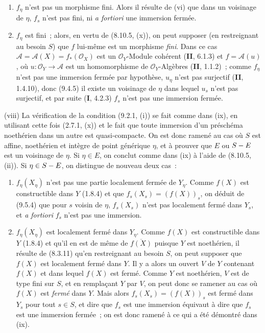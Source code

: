 \begin{enumerate}[label=\upshape{$\arabic{enumi}^\circ$}]
  \item $f_\eta$ n'est pas un morphisme fini. Alors il résulte de (vi) que dans
  un voisinage de $\eta$, $f_s$ n'est pas fini, ni \emph{a fortiori} une
  immersion fermée.

  \item $f_\eta$ est fini~; alors, en vertu de (8.10.5, (x)), on peut supposer
  (en restreignant au besoin $S$) que $f$ lui-même est un morphisme \emph{fini}.
  Dans ce cas $\mathcal A=\mathcal A(X)=f_*(\mathcal O_X)$ est un
  $\mathcal O_Y$-Module cohérent (\textbf{II}, 6.1.3) et
  $f=\mathcal A(u)$, où $u:\mathcal O_Y\to\mathcal A$ est un homomorphisme de
  $\mathcal O_Y$-Algèbres (\textbf{II}, 1.1.2)~; comme $f_\eta$ n'est pas une
  immersion fermée par hypothèse, $u_\eta$ n'est pas surjectif (\textbf{II},
  1.4.10), donc (9.4.5) il existe un voisinage de $\eta$ dans lequel $u_s$
  n'est pas surjectif, et par suite (\textbf{I}, 4.2.3) $f_s$ n'est pas une
  immersion fermée.
\end{enumerate}

(viii) La vérification de la condition (9.2.1, (i)) se fait comme dans (ix), en
utilisant cette fois (2.7.1, (x)) et le fait que toute immersion d'un préschéma
noethérien dans un autre est quasi-compacte. On est donc ramené au cas où $S$
est affine, noethérien et intègre de point générique $\eta$, et à prouver que
$E$ ou $S- E$ est un voisinage de $\eta$. Si $\eta\in E$, on conclut comme dans
(ix) à l'aide de (8.10.5, (ii)). Si $\eta\in S- E$, on distingue de nouveau
deux cas~:

\begin{enumerate}[label=\upshape{$\arabic{enumi}^\circ$}]
  \item{} $f_\eta(X_\eta)$ n'est pas une partie localement fermée de $Y_\eta$.
  Comme $f(X)$ est constructible dans $Y$ (1.8.4) et que
  $f_s(X_s)=(f(X))_s$, on déduit de (9.5.4) que pour $s$ voisin de $\eta$,
  $f_s(X_s)$ n'est pas localement fermé dans $Y_s$, et \emph{a fortiori}
  $f_s$ n'est pas une immersion.

  \item $f_\eta(X_\eta)$ est localement fermé dans $Y_\eta$.
  Comme $f(X)$ est constructible dans $Y$ (1.8.4) et qu'il en est de même de
  $\overline{f(X)}$ puisque $Y$ est noethérien, il résulte de (8.3.11) qu'en
  restreignant au besoin $S$, on peut supposer que $f(X)$ est localement fermé
  dans $Y$. Il y a alors un ouvert $V$ de $Y$ contenant $f(X)$ et dans lequel
  $f(X)$ est fermé. Comme $Y$ est noethérien, $V$ est de type fini sur $S$, et
  en remplaçant $Y$ par $V$, on peut donc se ramener au cas où $f(X)$ est
  \emph{fermé} dans $Y$. Mais alors $f_s(X_s)=(f(X))_s$ est fermé dans $Y_s$
  pour tout $s\in S$, et dire que $f_s$ est une immersion équivaut à dire que
  $f_s$ est une immersion fermée~; on est donc ramené à ce qui a été démontré
  dans (ix).
\end{enumerate}

